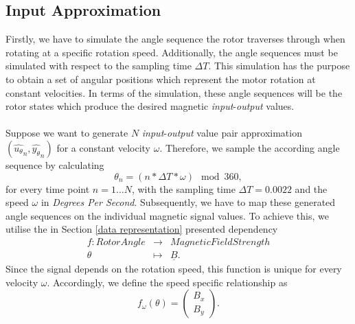 \documentclass[english]{isasthesis}
\begin{document}
    		\subsection{Input Approximation} 		
    		Firstly, we have to simulate the angle sequence the rotor traverses through when rotating at a specific rotation speed. Additionally, the angle sequences must be simulated with respect to the sampling time $\Delta T$. This simulation has the purpose to obtain a set of angular positions which represent the motor rotation at constant velocities. In terms of the simulation, these angle sequences will be the rotor states which produce the desired magnetic \textit{input}-\textit{output} values.\\\\
    		Suppose we want to generate $N$ \textit{input}-\textit{output} value pair approximation $(\hat{{u_\theta}}_n,\hat{{y_\theta}}_n)$ for a constant velocity $\omega$. Therefore, we sample the according angle sequence by calculating
    		\begin{equation}
    			\theta_n = (n * \Delta T * \omega) \mod 360,
    		\end{equation}
    		for every time point $n = 1 \dots N$, with the sampling time $\Delta T = 0.0022$ and the speed $\omega$ in \textit{Degrees Per Second}. Subsequently, we have to  map these generated angle sequences on the individual magnetic signal values. To achieve this, we utilise the in Section \ref{data representation} presented dependency
    		\begin{equation}
			\begin{array}{ccl}
			f:	Rotor Angle & \rightarrow & Magnetic Field Strength \\
				     \theta & \mapsto & \underline{B}.
			\end{array}	          			
			\end{equation} 
    		Since the signal depends on the rotation speed, this function is unique for every velocity $\omega$. Accordingly, we define the speed specific relationship  as 
    		\begin{equation}
    		f_\omega(\theta) = \begin{pmatrix}
    		B_x\\
    		B_y
    		\end{pmatrix}.
    		\end{equation}
\end{document}
